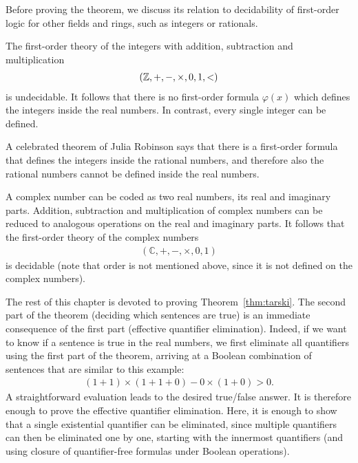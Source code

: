 Before proving the theorem, we discuss its relation to decidability of first-order logic for other fields and rings, such as integers or rationals.

\begin{example}
The  first-order theory of the integers with addition, subtraction and multiplication
\begin{align*}
(\mathbb{Z}, +, -, \times, 0, 1, <)
\end{align*}
is undecidable. It follows that there is no first-order formula $\varphi(x)$  which defines the integers inside the real numbers. In contrast, every single integer can be defined.	

A celebrated theorem of Julia Robinson says that there is a first-order formula that defines the integers inside the rational numbers, and therefore also the rational numbers cannot be defined inside the real numbers.
\end{example}

\begin{example}
	A complex number can be coded as two real numbers, its real and imaginary parts. Addition, subtraction and multiplication of complex numbers can be reduced to analogous operations on the real and imaginary parts. It follows  that the first-order theory  of the complex numbers
	\begin{align*}
  (\mathbb C, +, -, \times, 0, 1)
\end{align*}
	is decidable (note that order is not mentioned above, since it is not defined on the complex numbers).
\end{example}

The rest of this chapter is devoted to proving Theorem~\ref{thm:tarski}. 
The second part of the theorem (deciding which  sentences are true) is an immediate consequence of the first part (effective quantifier elimination). Indeed, if we want to know if a sentence is true in the real numbers, we first eliminate all quantifiers using the first part of the theorem, arriving at a Boolean combination of sentences that are similar to this example:
\begin{align*}
  (1  +  1) \times (1 + 1 + 0) - 0 \times (1 + 0) >  0.
\end{align*}
A straightforward evaluation leads to the desired true/false answer.  It is therefore enough to prove the effective quantifier elimination. Here, it is enough to show that a single existential quantifier can be eliminated, since multiple quantifiers can then be eliminated one by one, starting with the innermost quantifiers (and using closure of quantifier-free formulas under Boolean operations). 

